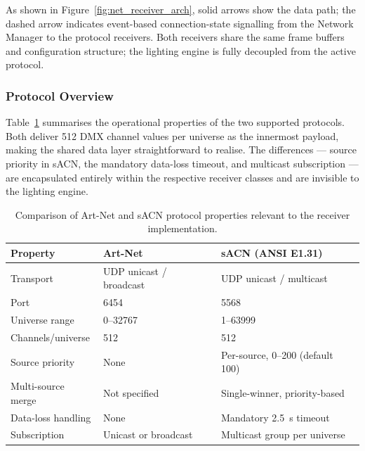 As shown in Figure~\ref{fig:net_receiver_arch}, solid arrows show the data path; the dashed arrow indicates event-based connection-state signalling from the Network Manager to the protocol receivers.
Both receivers share the same frame buffers and configuration structure; the lighting engine is fully decoupled from the active protocol.

\subsubsection{Protocol Overview}
\label{sec:net_proto_overview}

Table~\ref{tab:proto_comparison} summarises the operational properties of the two supported protocols.
Both deliver \num{512} \ac{DMX} channel values per universe as the innermost payload, making the shared data layer straightforward to realise.
The differences — source priority in \ac{sACN}, the mandatory data-loss timeout, and multicast subscription — are encapsulated entirely within the respective receiver classes and are invisible to the lighting engine.

\begin{table}[H]
  \caption{Comparison of Art-Net and \ac{sACN} protocol properties relevant to the receiver implementation.}
  \label{tab:proto_comparison}
  \centering
  \begin{tabularx}{\textwidth}{|l|X|X|}
    \hline
    \textbf{Property} & \textbf{Art-Net} & \textbf{sACN (ANSI E1.31)} \\ \hline \hline
    Transport          & UDP unicast / broadcast          & UDP unicast / multicast \\ \hline
    Port               & 6454                             & 5568 \\ \hline
    Universe range     & 0–32767                          & 1–63999 \\ \hline
    Channels/universe  & 512                              & 512 \\ \hline
    Source priority    & None                             & Per-source, 0–200 (default 100) \\ \hline
    Multi-source merge & Not specified                    & Single-winner, priority-based \\ \hline
    Data-loss handling & None                             & Mandatory \SI{2.5}{\second} timeout \\ \hline
    Subscription       & Unicast or broadcast             & Multicast group per universe \\ \hline
  \end{tabularx}
\end{table}

